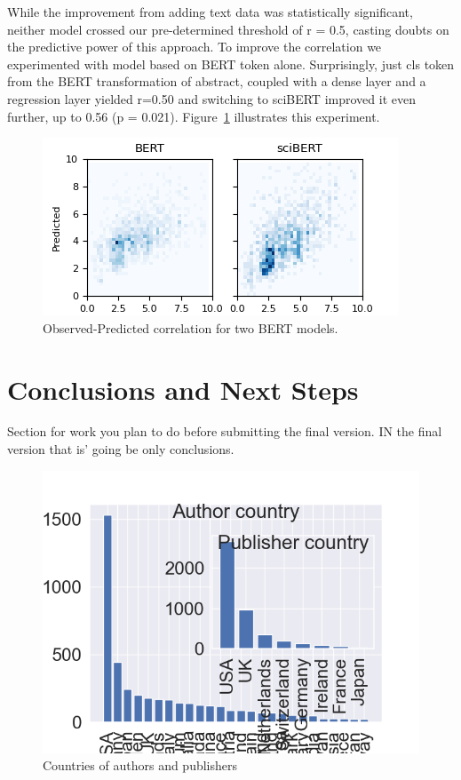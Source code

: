 \documentclass[11pt]{article}
\begin{document}
While the improvement from adding text data was statistically significant, neither model crossed our pre-determined threshold of r = 0.5, casting doubts on the predictive power of this approach. To improve the correlation we experimented with model based on BERT token alone. Surprisingly, just cls token from the BERT transformation of abstract, coupled with a dense layer and a regression layer yielded r=0.50 and switching to sciBERT improved it even further, up to 0.56 (p = 0.021). Figure~\ref{fig:BERT_vs_sciBERT} illustrates this experiment.

\begin{figure}
	\includegraphics[width= \columnwidth]{./Images/BERT vs sciBERT.png}
	\caption{Observed-Predicted correlation for two BERT models.}
	\label{fig:BERT_vs_sciBERT}
\end{figure}

\section{Conclusions and Next Steps}
Section for work you plan to do before submitting the final version. IN the final version that is' going be only conclusions.
\begin{figure}
	\includegraphics[width= \columnwidth]{./Images/Countries.png}
	\caption{Countries of authors and publishers}
	\label{fig:countries}
\end{figure}
\end{document}
